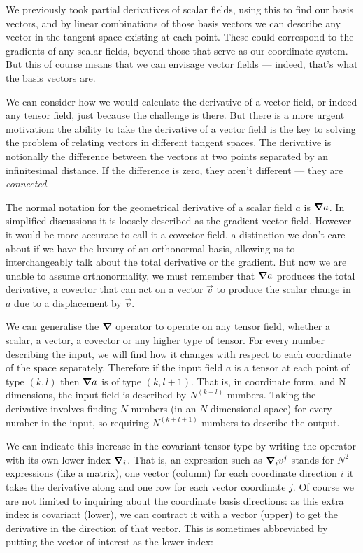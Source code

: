 We previously took partial derivatives of scalar fields, using this to find our basis vectors, and by linear combinations of those basis vectors we can describe any vector in the tangent space existing at each point. These could correspond to the gradients of any scalar fields, beyond those that serve as our coordinate system. But this of course means that we can envisage vector fields --- indeed, that's what the basis vectors are.

We can consider how we would calculate the derivative of a vector field, or indeed any tensor field, just because the challenge is there. But there is a more urgent motivation: the ability to take the derivative of a vector field is the key to solving the problem of relating vectors in different tangent spaces. The derivative is notionally the difference between the vectors at two points separated by an infinitesimal distance. If the difference is zero, they aren't different --- they are \textit{connected}.

The normal notation for the geometrical derivative of a scalar field $a$ is $\grad a$. In simplified discussions it is loosely described as the gradient vector field. However it would be more accurate to call it a covector field, a distinction we don't care about if we have the luxury of an orthonormal basis, allowing us to interchangeably talk about the total derivative or the gradient. But now we are unable to assume orthonormality, we must remember that $\grad a$ produces the total derivative, a covector that can act on a vector $\vec{v}$ to produce the scalar change in $a$ due to a displacement by $\vec{v}$.

We can generalise the $\grad$ operator to operate on any tensor field, whether a scalar, a vector, a covector or any higher type of tensor. For every number describing the input, we will find how it changes with respect to each coordinate of the space separately. Therefore if the input field $a$ is a tensor at each point of type $(k, l)$ then $\grad a$ is of type $(k, l + 1)$. That is, in coordinate form, and N dimensions, the input field is described by $N^{(k+l)}$ numbers. Taking the derivative involves finding $N$ numbers (in an $N$ dimensional space) for every number in the input, so requiring $N^{(k+l+1)}$ numbers to describe the output.

We can indicate this increase in the covariant tensor type by writing the operator with its own lower index $\grad_i$. That is, an expression such as $\grad_i v^j$ stands for $N^2$ expressions (like a matrix), one vector (column) for each coordinate direction $i$ it takes the derivative along and one row for each vector coordinate $j$. Of course we are not limited to inquiring about the coordinate basis directions: as this extra index is covariant (lower), we can contract it with a vector (upper) to get the derivative in the direction of that vector. This is sometimes abbreviated by putting the vector of interest as the lower index:

